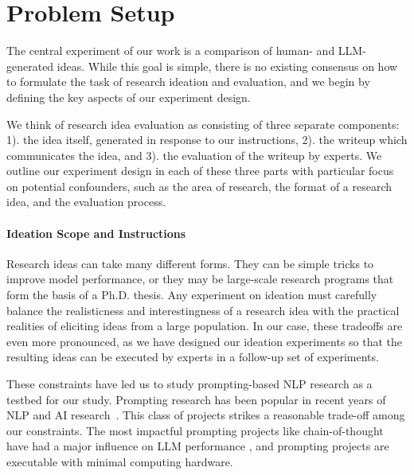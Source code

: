 \section{Problem Setup}
\label{sec:problem}
The central experiment of our work is a comparison of human- and LLM-generated ideas. While this goal is simple, there is no existing consensus on how to formulate the task of research ideation and evaluation, and we begin by defining the key aspects of our experiment design.

We think of research idea evaluation as consisting of three separate components: 1). the idea itself, generated in response to our instructions, 2). the writeup which communicates the idea, and 3). the evaluation of the writeup by experts. We outline our experiment design in each of these three parts with particular focus on potential confounders, such as the area of research, the format of a research idea, and the evaluation process. 

\paragraph{Ideation Scope and Instructions}

Research ideas can take many different forms. They can be simple tricks to improve model performance, or they may be large-scale research programs that form the basis of a Ph.D. thesis. Any experiment on ideation must carefully balance the realisticness and interestingness of a research idea with the practical realities of eliciting ideas from a large population. In our case, these tradeoffs are even more pronounced, as we have designed our ideation experiments so that the resulting ideas can be executed by experts in a follow-up set of experiments.

These constraints have led us to study prompting-based NLP research as a testbed for our study. Prompting research has been popular in recent years of NLP and AI research~\cite[e.g.,][inter alia]{Wei2022ChainOT,Si2022PromptingGT,Wang2022SelfConsistencyIC,Zhou2022LeasttoMostPE,Chen2022ProgramOT,Madaan2023SelfRefineIR,Yasunaga2023LargeLM,Yao2023TreeOT,Diao2023ActivePW,Qin2023LargeLM,Schulhoff2024ThePR}. This class of projects strikes a reasonable trade-off among our constraints. The most impactful prompting projects like chain-of-thought have had a major influence on LLM performance \citep{Wei2022ChainOT}, and prompting projects are executable with minimal computing hardware. 


